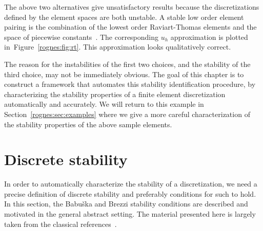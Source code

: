 The above two alternatives give unsatisfactory results because the
discretizations defined by the element spaces are both unstable. A
stable low order element pairing is the combination of the lowest
order Raviart-Thomas elements and the space of piecewise
constants~\cite{RaviartThomas1977}. The corresponding $u_h$
approximation is plotted in~Figure~\ref{rognes:fig:rt}. This
approximation looks qualitatively correct.

The reason for the instabilities of the first two choices, and the
stability of the third choice, may not be immediately obvious. The
goal of this chapter is to construct a framework that automates this
stability identification procedure, by characterizing the stability
properties of a finite element discretization automatically and
accurately.  We will return to this example in
Section~\ref{rognes:sec:examples} where we give a more careful
characterization of the stability properties of the above sample
elements.



\section{Discrete stability}

In order to automatically characterize the stability of a
discretization, we need a precise definition of discrete stability and
preferably conditions for such to hold. In this section, the Babu\v
ska and Brezzi stability conditions are described and motivated in the
general abstract setting. The material presented here is largely taken
from the classical references~\cite{Babuvska1972/73, Brezzi1974,
  BrezziFortin1991}.

